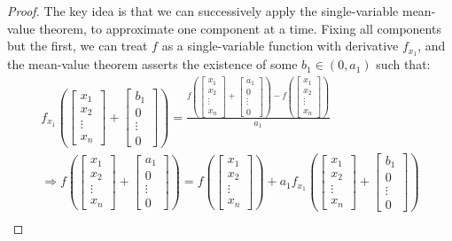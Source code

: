 \documentclass{article}
\theoremstyle{definition}
\begin{document}
\begin{proof}
	The key idea is that we can successively apply the single-variable mean-value theorem, to approximate one component at a time. Fixing all components but the first, we can treat $f$ as a single-variable function with derivative $f_{x_1}$, and the mean-value theorem asserts the existence of some $b_1\in(0,a_1)$ such that:
	\begin{align*}
		f_{x_1}\left(\begin{bmatrix}x_1\\x_2\\\vdots\\x_n\end{bmatrix}+\begin{bmatrix}b_1\\0\\\vdots\\0\end{bmatrix}\right)=\frac{f\left(\begin{bmatrix}x_1\\x_2\\\vdots\\x_n\end{bmatrix}+\begin{bmatrix}a_1\\0\\\vdots\\0\end{bmatrix}\right)-f\left(\begin{bmatrix}x_1\\x_2\\\vdots\\x_n\end{bmatrix}\right)}{a_1}\\
		\Rightarrow f\left(\begin{bmatrix}x_1\\x_2\\\vdots\\x_n\end{bmatrix}+\begin{bmatrix}a_1\\0\\\vdots\\0\end{bmatrix}\right)=f\left(\begin{bmatrix}x_1\\x_2\\\vdots\\x_n\end{bmatrix}\right)+a_1f_{x_1}\left(\begin{bmatrix}x_1\\x_2\\\vdots\\x_n\end{bmatrix}+\begin{bmatrix}b_1\\0\\\vdots\\0\end{bmatrix}\right)\\

\end{align*}
\end{proof}
\end{document}
